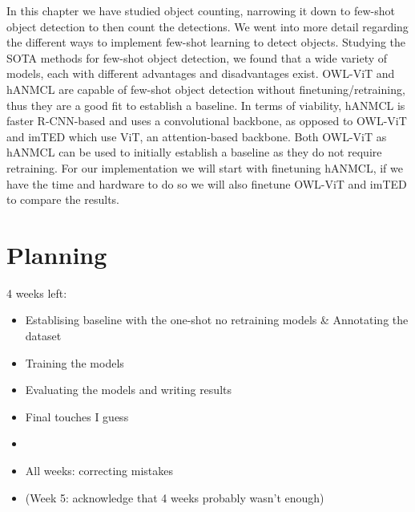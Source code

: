 In this chapter we have studied object counting, narrowing it down to few-shot object detection to then count the detections. We went into more detail regarding the different ways to implement few-shot learning to detect objects. Studying the SOTA methods for few-shot object detection, we found that a wide variety of models, each with different advantages and disadvantages exist. OWL-ViT and hANMCL are capable of few-shot object detection without finetuning/retraining, thus they are a good fit to establish a baseline. In terms of viability, hANMCL is faster R-CNN-based and uses a convolutional backbone, as opposed to OWL-ViT and imTED which use ViT, an attention-based backbone. Both OWL-ViT as hANMCL can be used to initially establish a baseline as they do not require retraining. For our implementation we will start with finetuning hANMCL, if we have the time and hardware to do so we will also finetune OWL-ViT and imTED to compare the results.

\section {Planning}
4 weeks left:
\begin{itemize}
	\item Establising baseline with the one-shot no retraining models \& Annotating the dataset
	\item Training the models
	\item Evaluating the models and writing results
	\item Final touches I guess
	\item 
	\item All weeks: correcting mistakes
	\item (Week 5: acknowledge that 4 weeks probably wasn't enough)
\end{itemize}